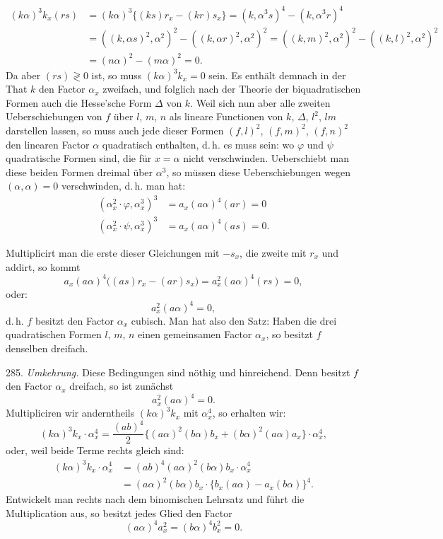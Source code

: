 \[
\begin{aligned}
(k\alpha)^3k_x(rs) &= (k\alpha)^3\{(ks)r_x-(kr)s_x\} = (k,\alpha^3s)^4-(k,\alpha^3r)^4\\
&= ((k,\alpha s)^2,\alpha^2)^2-((k,\alpha r)^2,\alpha^2)^2=((k,m)^2,\alpha^2)^2-((k,l)^2,\alpha^2)^2\\
&= (n\alpha)^2-(m\alpha)^2=0.
\end{aligned}
\]
Da aber $(rs)\gtrless 0$ ist, so muss $(k\alpha)^3k_x=0$ sein. Es enthält demnach in der That $k$ den Factor $\alpha_x$ zweifach, und folglich nach der Theorie der biquadratischen Formen auch die Hesse'sche Form $\varDelta$ von $k$. Weil sich nun aber alle zweiten Ueberschiebungen von $f$ über $l$, $m$, $n$ als lineare Functionen von $k$, $\varDelta$, $l^2$, $lm$ darstellen lassen, so muss auch jede dieser Formen $(f,l)^2$, $(f,m)^2$, $(f,n)^2$ den linearen Factor $\alpha$ quadratisch enthalten, d.\,h. es muss sein:
wo $\varphi$ und $\psi$ quadratische Formen sind, die für $x=\alpha$ nicht verschwinden. Ueberschiebt man diese beiden Formen dreimal über $\alpha^3$, so müssen diese Ueberschiebungen wegen $(\alpha,\alpha)=0$ verschwinden, d.\,h. man hat:
\[
\begin{aligned}
(\alpha_x^2\cdot\varphi,\alpha_x^3)^3&=a_x(a\alpha)^4(ar)=0\\
(\alpha_x^2\cdot\psi,\alpha_x^3)^3&=a_x(a\alpha)^4(as)=0.
\end{aligned}
\]

Multiplicirt man die erste dieser Gleichungen mit $-s_x$, die zweite mit $r_x$ und addirt, so kommt
\[
a_x(a\alpha)^4\big((as)r_x-(ar)s_x\big)=a_x^2(a\alpha)^4(rs)=0,
\]
oder:
\[
a_x^2(a\alpha)^4=0,
\]
d.\,h. $f$ besitzt den Factor $\alpha_x$ cubisch. Man hat also den Satz:
\glqq Haben die drei quadratischen Formen $l$, $m$, $n$ einen gemeinsamen Factor $\alpha_x$, so besitzt $f$ denselben dreifach.\grqq{}

285. \textit{Umkehrung.} Diese Bedingungen sind nöthig und hinreichend.
Denn besitzt $f$ den Factor $\alpha_x$ dreifach, so ist zunächst
\[
a_x^2(a\alpha)^4=0.
\]
Multipliciren wir anderntheils $(k\alpha)^3k_x$ mit $\alpha_x^4$, so erhalten wir:
\[
(k\alpha)^3k_x\cdot\alpha_x^4=\frac{(ab)^4}{2}\{(a\alpha)^2(b\alpha)b_x+(b\alpha)^2(a\alpha)a_x\}\cdot\alpha_x^4,
\]
oder, weil beide Terme rechts gleich sind:
\[
\begin{aligned}
(k\alpha)^3k_x\cdot\alpha_x^4&=(ab)^4(a\alpha)^2(b\alpha)b_x\cdot\alpha_x^4\\
&=(a\alpha)^2(b\alpha)b_x\cdot\{b_x(a\alpha)-a_x(b\alpha)\}^4.
\end{aligned}
\]
Entwickelt man rechts nach dem binomischen Lehrsatz und führt die Multiplication aus, so besitzt jedes Glied den Factor
\[
(a\alpha)^4a_x^2=(b\alpha)^4b_x^2=0.
\]


